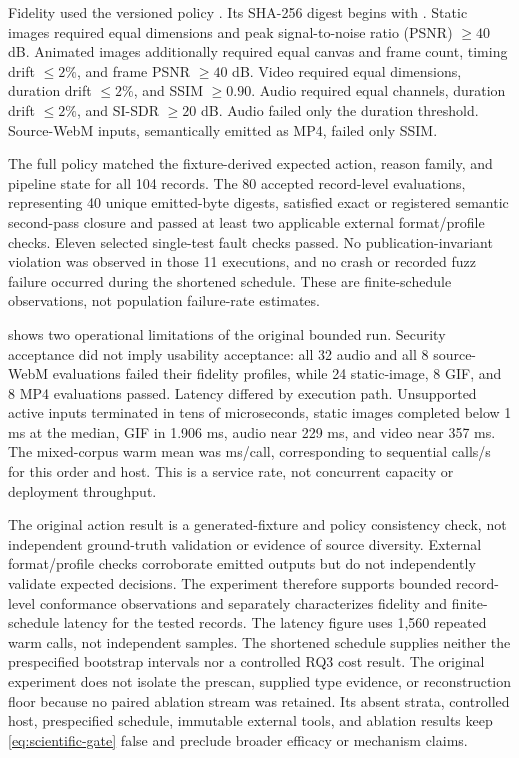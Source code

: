 

Fidelity used the versioned policy
\texttt{\AFDExperimentFidelityPolicyVersion}. Its SHA-256 digest begins with
\AFDExperimentFidelityPolicyHashShort. Static images required equal dimensions and
peak signal-to-noise ratio (PSNR) \(\geq40\) dB. Animated images additionally
required equal canvas and frame count, timing drift \(\leq2\%\), and frame PSNR
\(\geq40\) dB. Video required equal dimensions, duration drift \(\leq2\%\), and
SSIM \(\geq0.90\). Audio required equal channels, duration drift \(\leq2\%\),
and SI-SDR \(\geq20\) dB. Audio failed only the duration threshold.
Source-WebM inputs, semantically emitted as MP4, failed only SSIM.

The full policy matched the fixture-derived expected action, reason family, and
pipeline state for all 104 records. The 80 accepted record-level evaluations,
representing 40 unique emitted-byte digests, satisfied exact or registered
semantic second-pass closure and passed at least two applicable external
format/profile checks. Eleven selected single-test fault checks passed. No
publication-invariant violation was observed in those 11 executions, and no
crash or recorded fuzz failure occurred during the shortened schedule. These
are finite-schedule observations, not population failure-rate estimates.

 shows two operational limitations
of the original bounded run. Security acceptance did not imply usability
acceptance: all 32 audio and all 8 source-WebM evaluations failed their fidelity
profiles, while 24 static-image, 8 GIF, and 8 MP4 evaluations passed. Latency
differed by execution path.
Unsupported active inputs terminated in tens of microseconds, static images
completed below 1 ms at the median, GIF in 1.906 ms, audio near 229 ms, and
video near 357 ms. The mixed-corpus warm mean was
\AFDExperimentWarmMean{} ms/call, corresponding to
\AFDExperimentSequentialRate{} sequential calls/s for this order and host. This
is a service rate, not concurrent capacity or deployment throughput.

The original action result is a generated-fixture and policy consistency check,
not independent ground-truth validation or evidence of source diversity. External
format/profile checks corroborate emitted outputs but do not independently
validate expected decisions. The experiment therefore supports bounded
record-level conformance observations and separately characterizes fidelity and
finite-schedule latency for the tested records. The latency figure uses 1,560
repeated warm calls, not independent samples. The shortened schedule supplies
neither the prespecified bootstrap intervals nor a controlled RQ3 cost result.
The original experiment does not isolate the prescan, supplied type evidence,
or reconstruction floor because no paired ablation stream was retained. Its
absent strata, controlled host, prespecified schedule, immutable external tools,
and ablation results keep
\cref{eq:scientific-gate} false and preclude broader efficacy or mechanism
claims.

